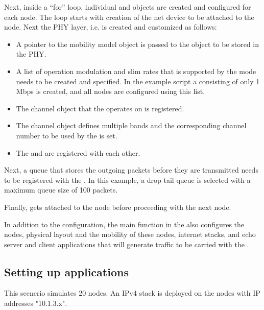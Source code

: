 Next, inside a ``for'' loop, individual  and  objects are created and configured for each node. The loop starts with creation of the net device to be attached to the node. Next the PHY layer, i.e.  is created and customized as follows:
\begin{itemize}
\item A pointer to the mobility model object is passed to the  object to be stored in the PHY. 

\item A list of operation modulation and slim rates that is supported by the mode  needs to be created and specified. In the example script a  consisting of only 1 Mbps is created, and all nodes are configured using this list. 

\item The channel object that the  operates on is registered. 

\item The channel object defines multiple bands and the corresponding channel number to be used by the  is set. 

\item The  and   are registered with each other. 
\end{itemize}

Next, a queue that stores the outgoing packets before they are transmitted needs to be registered with the . In this example, a drop tail queue is selected with a maximum queue size of 100 packets. 

Finally,  gets attached to the node before proceeding with the next node. 

In addition to the  configuration, the main function in the  also configures the nodes, physical layout and the mobility of these nodes, internet stacks, and echo server and client applications that will generate traffic to be carried with the .

\subsection{Setting up applications}
This scenerio simulates 20 nodes. An IPv4 stack is deployed on the nodes with IP addresses "10.1.3.x".

